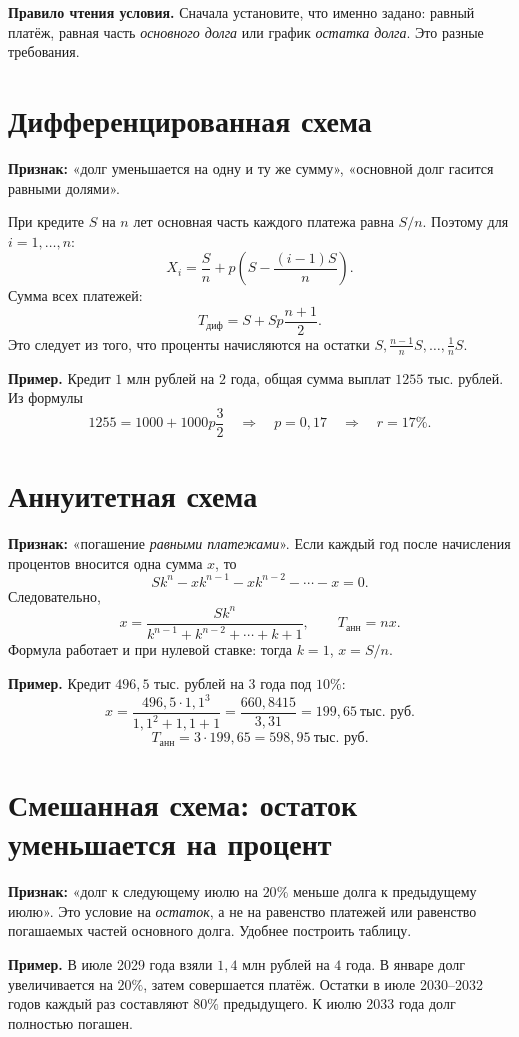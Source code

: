 \documentclass[a4paper,12pt]{article}
\begin{document}
\textbf{Правило чтения условия.} Сначала установите, что именно задано:
равный платёж, равная часть \emph{основного долга} или график \emph{остатка долга}.
Это разные требования.

\section{Дифференцированная схема}
\textbf{Признак:} «долг уменьшается на одну и ту же сумму», «основной долг
гасится равными долями».

При кредите \(S\) на \(n\) лет основная часть каждого платежа равна \(S/n\).
Поэтому для \(i=1,\ldots,n\):
\[
\boxed{X_i=\frac Sn+p\left(S-\frac{(i-1)S}{n}\right).}
\]
Сумма всех платежей:
\[
\boxed{T_{\text{диф}}=S+Sp\frac{n+1}{2}.}
\]
Это следует из того, что проценты начисляются на остатки
\(S,\frac{n-1}{n}S,\ldots,\frac1nS\).

\textbf{Пример.} Кредит \(1\) млн рублей на \(2\) года, общая сумма выплат
\(1255\) тыс. рублей. Из формулы
\[
1255=1000+1000p\frac{3}{2}
\quad\Longrightarrow\quad p=0,17
\quad\Longrightarrow\quad\boxed{r=17\%}.
\]

\section{Аннуитетная схема}
\textbf{Признак:} «погашение \emph{равными платежами}».
Если каждый год после начисления процентов вносится одна сумма \(x\), то
\[
Sk^n-xk^{n-1}-xk^{n-2}-\cdots-x=0.
\]
Следовательно,
\[
\boxed{x=\frac{Sk^n}{k^{n-1}+k^{n-2}+\cdots+k+1}},
\qquad \boxed{T_{\text{анн}}=nx}.
\]
Формула работает и при нулевой ставке: тогда \(k=1\), \(x=S/n\).

\textbf{Пример.} Кредит \(496,5\) тыс. рублей на \(3\) года под \(10\%\):
\[
x=\frac{496,5\cdot1,1^3}{1,1^2+1,1+1}
=\frac{660,8415}{3,31}=199,65\ \text{тыс. руб.}
\]
\[
\boxed{T_{\text{анн}}=3\cdot199,65=598,95\ \text{тыс. руб.}}
\]
\clearpage

\section{Смешанная схема: остаток уменьшается на процент}
\textbf{Признак:} «долг к следующему июлю на \(20\%\) меньше долга к предыдущему июлю».
Это условие на \emph{остаток}, а не на равенство платежей или равенство
погашаемых частей основного долга. Удобнее построить таблицу.

\textbf{Пример.} В июле 2029 года взяли \(1,4\) млн рублей на \(4\) года.
В январе долг увеличивается на \(20\%\), затем совершается платёж.
Остатки в июле 2030--2032 годов каждый раз составляют \(80\%\) предыдущего.
К июлю 2033 года долг полностью погашен.
\end{document}
